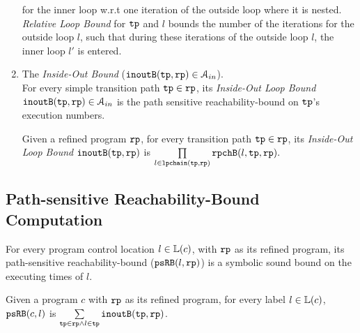 \begin{enumerate}
{for the inner loop w.r.t one iteration of the outside loop where it is nested.
\emph{Relative Loop Bound} for $\mathtt{tp}$ and $l$ bounds the number of the iterations for
the outside loop $l$,
such that during these iterations of the outside loop $l$, the inner loop $l'$ is entered. 
}
\item The \emph{Inside-Out Bound} ($\mathtt{inoutB}(\mathtt{tp}, \mathtt{rp}) \in \mathcal{A}_{in}$).
\\
For every simple transition path $\mathtt{tp} \in \mathtt{rp}$,
its \emph{Inside-Out Loop Bound}
 $\mathtt{inoutB}(\mathtt{tp}, \mathtt{rp}) \in \mathcal{A}_{in}$ is 
the path sensitive reachability-bound on $\mathtt{tp}$'s execution numbers.

\begin{defn}
  \label{def:outin_bound}
  Given a refined program $\mathtt{rp}$, for every transition path $\mathtt{tp} \in \mathtt{rp}$, 
  its \emph{Inside-Out Loop Bound}
  $\mathtt{inoutB}(\mathtt{tp}, \mathtt{rp})$ is 
$
  \prod\limits_{l \in \mathtt{lpchain}(\mathtt{tp}, \mathtt{rp})} \mathtt{rpchB}(l, \mathtt{tp}, \mathtt{rp}).
$
\end{defn}
\end{enumerate}
\subsection{Path-sensitive Reachability-Bound Computation}

For every program control location $l \in \mathbb{L}(c)$, with $\mathtt{rp}$ as its refined program,
its path-sensitive reachability-bound ($\mathtt{psRB}(l, \mathtt{rp})$) is a symbolic sound bound on the executing times of $l$.
 \begin{defn}
  \label{def:label_psrb}
  Given a program $c$ with $\mathtt{rp}$ as its refined program,
  for every label $l \in \mathbb{L}(c)$, $\mathtt{psRB}(c, l)$ is $\sum\limits_{\mathtt{tp} \in \mathtt{rp} \land 
  l \in \mathtt{tp}} \mathtt{inoutB}(\mathtt{tp}, \mathtt{rp})$.
 \end{defn}